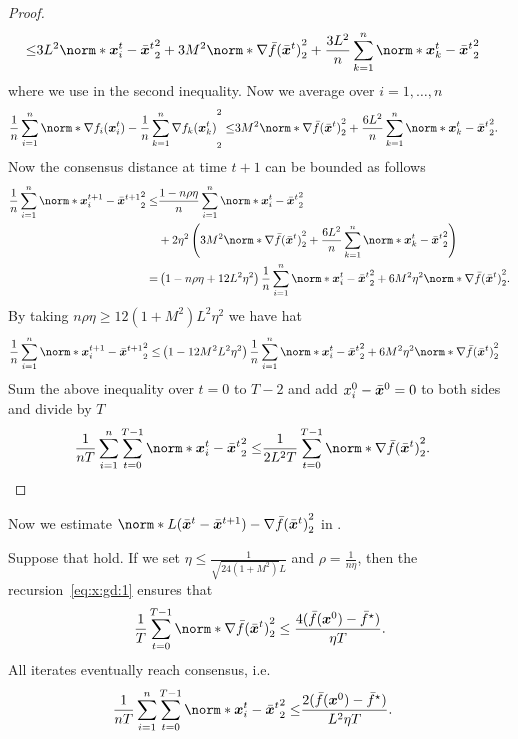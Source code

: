 \documentclass{article}
\begin{document}
\begin{proof}
\begin{align*}
    \le& 3 L^2 \norm*{\xx_i^t - \bar{\xx}^t}_2^2 + 3 M^2 \norm*{ \nabla \bar{f}(\bar{\xx}^t) }_2^2 + \frac{3L^2}{n} \sum_{k=1}^n \norm*{\xx_k^t - \bar{\xx}^t}_2^2
  \end{align*}
  where we use  in the second inequality. Now we average over $i=1,\ldots,n$
  \begin{align*}
    \frac{1}{n}\sum_{i=1}^n\norm*{\nabla f_i(\xx_i^t) - \frac{1}{n}\sum_{k=1}^n\nabla f_k(\xx_k^t)}_2^2
    \le&  3 M^2 \norm*{ \nabla \bar{f}(\bar{\xx}^t) }_2^2 + \frac{6L^2}{n} \sum_{k=1}^n \norm*{\xx_k^t - \bar{\xx}^t}_2^2.
  \end{align*}
  Now the consensus distance at time $t+1$ can be bounded as follows
  \begin{align*}
    \frac{1}{n}\sum_{i=1}^n \norm*{\xx_i^{t+1} - \bar{\xx}^{t+1}}_2^2
    \le& \frac{1-n\rho\eta}{n}\sum_{i=1}^n \norm*{\xx_i^{t} - \bar{\xx}^{t}}_2^2 \\
    &+ 2\eta^2 \left(
      3M^2 \norm*{\nabla \bar{f}(\bar{\xx}^t) }_2^2 + \frac{6L^2}{n} \sum_{k=1}^n \norm*{\xx_k^t - \bar{\xx}^t}_2^2
    \right) \\
    =& \left(1-n\rho\eta+ 12L^2\eta^2 \right) \frac{1}{n}\sum_{i=1}^n \norm*{\xx_i^{t} - \bar{\xx}^{t}}_2^2
    + 6M^2\eta^2 \norm*{\nabla \bar{f}(\bar{\xx}^t) }_2^2.
  \end{align*}
  By taking $n\rho\eta\ge 12 (1+M^2) L^2\eta^2$ we have hat
  \begin{align*}
    \frac{1}{n}\sum_{i=1}^n \norm*{\xx_i^{t+1} - \bar{\xx}^{t+1}}_2^2
    \le& \left(1-12M^2L^2\eta^2\right) \frac{1}{n}\sum_{i=1}^n \norm*{\xx_i^{t} - \bar{\xx}^{t}}_2^2
    + 6M^2\eta^2 \norm*{\nabla \bar{f}(\bar{\xx}^t) }_2^2
  \end{align*}
  Sum the above inequality over $t=0$ to $T-2$ and add $x_i^0-\bar{\bm{x}}^0=0$ to both sides and divide by $T$
  \begin{align*}
    \frac{1}{nT}\sum_{i=1}^n\sum_{t=0}^{T-1} \norm*{\xx_i^{t} - \bar{\xx}^{t}}_2^2
    \le& \frac{1}{2L^2T} \sum_{t=0}^{T-1} \norm*{\nabla \bar{f}(\bar{\xx}^t) }_2^2.
  \end{align*}
\end{proof}
Now we estimate $\norm*{L(\bar{\xx}^{t}-\bar{\xx}^{t+1}) - \nabla \bar{f}(\bar{\xx}^{t})}_2^2$ in .
\begin{theorem}
  Suppose that  hold. If we set $\eta\le \frac{1}{\sqrt{24(1+M^2)}L}$ and $\rho=\frac{1}{n\eta}$, then the recursion~\eqref{eq:x:gd:1} ensures that
  \begin{align*}
    \frac{1}{T} \sum_{t=0}^{T-1} \norm*{\nabla \bar{f}(\bar{\xx}^{t})}_2^2
    \le \frac{4(\bar{f}(\xx^{0}) - \bar{f}^\star)}{\eta T}.
  \end{align*}
  All iterates eventually reach consensus, i.e.
  \begin{align*}
    \frac{1}{nT}\sum_{i=1}^n\sum_{t=0}^{T-1} \norm*{\xx_i^{t} - \bar{\xx}^{t}}_2^2
    \le&  \frac{2(\bar{f}(\xx^{0}) - \bar{f}^\star)}{L^2\eta T}.
  \end{align*}
\end{theorem}
\end{document}
